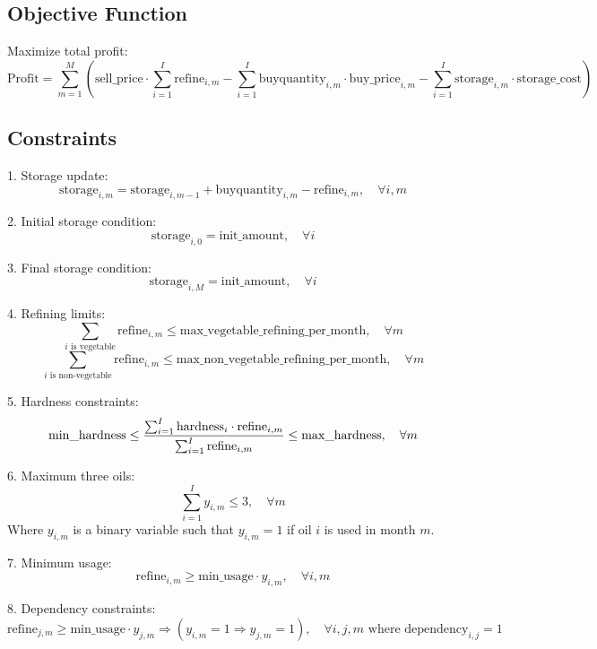 \documentclass{article}
\begin{document}
\subsection*{Objective Function}
Maximize total profit:
\[
\text{Profit} = \sum_{m=1}^{M} \left( \text{sell\_price} \cdot \sum_{i=1}^{I} \text{refine}_{i,m} - \sum_{i=1}^{I} \text{buyquantity}_{i,m} \cdot \text{buy\_price}_{i,m} - \sum_{i=1}^{I} \text{storage}_{i,m} \cdot \text{storage\_cost} \right)
\]

\subsection*{Constraints}

1. Storage update:
\[
\text{storage}_{i,m} = \text{storage}_{i,m-1} + \text{buyquantity}_{i,m} - \text{refine}_{i,m}, \quad \forall i, m
\]

2. Initial storage condition:
\[
\text{storage}_{i,0} = \text{init\_amount}, \quad \forall i
\]

3. Final storage condition:
\[
\text{storage}_{i,M} = \text{init\_amount}, \quad \forall i
\]

4. Refining limits:
\[
\sum_{i \text{ is vegetable}} \text{refine}_{i,m} \leq \text{max\_vegetable\_refining\_per\_month}, \quad \forall m
\]
\[
\sum_{i \text{ is non-vegetable}} \text{refine}_{i,m} \leq \text{max\_non\_vegetable\_refining\_per\_month}, \quad \forall m
\]

5. Hardness constraints:
\[
\text{min\_hardness} \leq \frac{\sum_{i=1}^{I} \text{hardness}_{i} \cdot \text{refine}_{i,m}}{\sum_{i=1}^{I} \text{refine}_{i,m}} \leq \text{max\_hardness}, \quad \forall m \\
\]

6. Maximum three oils:
\[
\sum_{i=1}^{I} y_{i,m} \leq 3, \quad \forall m
\]
Where \( y_{i,m} \) is a binary variable such that \( y_{i,m} = 1 \) if oil \( i \) is used in month \( m \).

7. Minimum usage:
\[
\text{refine}_{i,m} \geq \text{min\_usage} \cdot y_{i,m}, \quad \forall i, m
\]

8. Dependency constraints:
\[
\text{refine}_{j,m} \geq \text{min\_usage} \cdot y_{j,m} \Rightarrow (y_{i,m} = 1 \Rightarrow y_{j,m} = 1), \quad \forall i,j,m \text{ where } \text{dependency}_{i,j} = 1
\]
\end{document}
